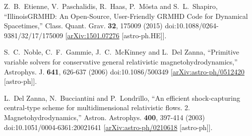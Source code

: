 \documentclass{article}
\begin{document}
\begin{thebibliography}{9}

Z.~B.~Etienne, V.~Paschalidis, R.~Haas, P.~M\"osta and S.~L.~Shapiro,
``IllinoisGRMHD: An Open-Source, User-Friendly GRMHD Code for Dynamical
Spacetimes,''
Class. Quant. Grav. \textbf{32}, 175009 (2015)
doi:10.1088/0264-9381/32/17/175009
[\href{https://arxiv.org/abs/1501.07276}{arXiv:1501.07276} [astro-ph.HE]].

S.~C.~Noble, C.~F.~Gammie, J.~C.~McKinney and L.~Del Zanna,
``Primitive variable solvers for conservative general relativistic
magnetohydrodynamics,''
Astrophys. J. \textbf{641}, 626-637 (2006)
doi:10.1086/500349
[\href{https://arxiv.org/abs/astro-ph/0512420}{arXiv:astro-ph/0512420} [astro-ph]].

L.~Del Zanna, N.~Bucciantini and P.~Londrillo,
``An efficient shock-capturing central-type scheme for multidimensional
relativistic flows. 2. Magnetohydrodynamics,''
Astron. Astrophys. \textbf{400}, 397-414 (2003)
doi:10.1051/0004-6361:20021641
[\href{https://arxiv.org/abs/astro-ph/0210618}{arXiv:astro-ph/0210618} [astro-ph]].

\end{thebibliography}



\end{document}

